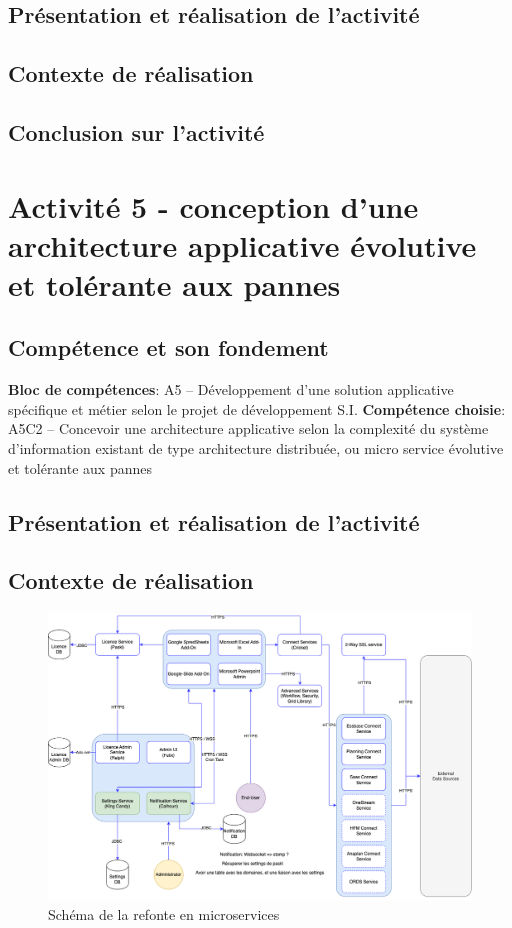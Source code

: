 \documentclass[a4paper, 11pt]{report}
\begin{document}
\subsection{Présentation et réalisation de l'activité}
\subsection{Contexte de réalisation}
\subsection{Conclusion sur l'activité}

\section{Activité 5 - conception d'une architecture applicative évolutive et tolérante aux pannes}
\subsection{Compétence et son fondement}
\textbf{Bloc de compétences}: A5 – Développement d’une solution applicative spécifique et métier selon le projet de développement S.I.
\newline
\textbf{Compétence choisie}: A5C2 – Concevoir une architecture applicative selon la complexité du système d’information existant de type architecture distribuée, ou micro service évolutive et tolérante aux pannes
\subsection{Présentation et réalisation de l'activité}
\subsection{Contexte de réalisation}
  \begin{figure}[h]
      \centering
      \includegraphics[scale=0.40,center]{schemas/schema-qibates-v2.png}
      \caption{Schéma de la refonte en microservices}
  \end{figure}
\end{document}
